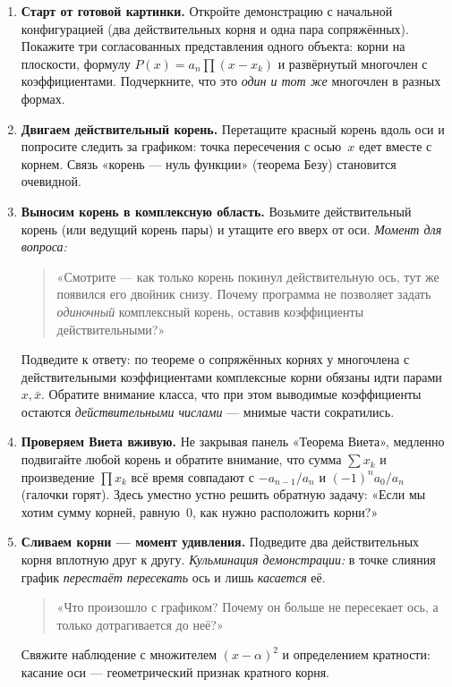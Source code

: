 \begin{enumerate}
  \item \textbf{Старт от готовой картинки.} Откройте демонстрацию с
    начальной конфигурацией (два действительных корня и одна пара
    сопряжённых). Покажите три согласованных представления одного
    объекта: корни на плоскости, формулу
    $P(x) = a_n\prod(x - x_k)$ и развёрнутый многочлен с
    коэффициентами. Подчеркните, что это \emph{один и тот же}
    многочлен в разных формах.

  \item \textbf{Двигаем действительный корень.} Перетащите красный
    корень вдоль оси и попросите следить за графиком: точка
    пересечения с осью~$x$ едет вместе с корнем. Связь «корень — нуль
    функции» (теорема Безу) становится очевидной.

  \item \textbf{Выносим корень в комплексную область.} Возьмите
    действительный корень (или ведущий корень пары) и утащите его
    вверх от оси. \emph{Момент для вопроса:}
    \begin{quote}
      «Смотрите — как только корень покинул действительную ось, тут же
      появился его двойник снизу. Почему программа не позволяет
      задать \emph{одиночный} комплексный корень, оставив
      коэффициенты действительными?»
    \end{quote}
    Подведите к ответу: по теореме о сопряжённых корнях у многочлена с
    действительными коэффициентами комплексные корни обязаны идти
    парами $x, \bar x$. Обратите внимание класса, что при этом
    выводимые коэффициенты остаются \emph{действительными числами} —
    мнимые части сократились.

  \item \textbf{Проверяем Виета вживую.} Не закрывая панель «Теорема
    Виета», медленно подвигайте любой корень и обратите внимание, что
    сумма $\sum x_k$ и произведение $\prod x_k$ всё время совпадают с
    $-a_{n-1}/a_n$ и $(-1)^n a_0/a_n$ (галочки горят). Здесь уместно
    устно решить обратную задачу: «Если мы хотим сумму корней,
    равную~$0$, как нужно расположить корни?»

  \item \textbf{Сливаем корни — момент удивления.} Подведите два
    действительных корня вплотную друг к другу. \emph{Кульминация
    демонстрации:} в точке слияния график \emph{перестаёт пересекать}
    ось и лишь \emph{касается} её.
    \begin{quote}
      «Что произошло с графиком? Почему он больше не пересекает ось, а
      только дотрагивается до неё?»
    \end{quote}
    Свяжите наблюдение с множителем $(x - \alpha)^2$ и определением
    кратности: касание оси — геометрический признак кратного корня.


\end{enumerate}
